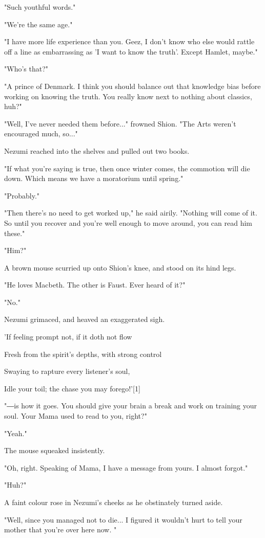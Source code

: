 "Such youthful words."

"We're the same age."

"I have more life experience than you. Geez, I don't know who else would
rattle off a line as embarrassing as 'I want to know the truth'. Except
Hamlet, maybe."

"Who's that?"

"A prince of Denmark. I think you should balance out that knowledge bias
before working on knowing the truth. You really know next to nothing
about classics, huh?"

"Well, I've never needed them before..." frowned Shion. "The Arts
weren't encouraged much, so..."

Nezumi reached into the shelves and pulled out two books.~

"If what you're saying is true, then once winter comes, the commotion
will die down. Which means we have a moratorium until spring."

"Probably."

"Then there's no need to get worked up," he said airily. "Nothing will
come of it. So until you recover and you're well enough to move around,
you can read him these."

"Him?"

A brown mouse scurried up onto Shion's knee, and stood on its hind legs.

"He loves Macbeth. The other is Faust. Ever heard of it?"

"No."

Nezumi grimaced, and heaved an exaggerated sigh.

'If feeling prompt not, if it doth not flow

Fresh from the spirit's depths, with strong control

Swaying to rapture every listener's soul,

Idle your toil; the chase you may forego!'{[}1{]}

"―is how it goes. You should give your brain a break and work on
training your soul. Your Mama used to read to you, right?"

"Yeah."

The mouse squeaked insistently.

"Oh, right. Speaking of Mama, I have a message from yours. I almost
forgot."

"Huh?"

A faint colour rose in Nezumi's cheeks as he obstinately turned aside.

"Well, since you managed not to die... I figured it wouldn't hurt to
tell your mother that you're over here now. "


